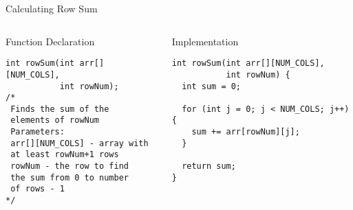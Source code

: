 \documentclass{beamer}
\begin{document}
\begin{frame}{Calculating Row Sum}
    \begin{columns}
        \begin{column}{0.48\textwidth}
            \begin{block}{Function Declaration}
                \begin{lstlisting}[basicstyle=\ttfamily\footnotesize]
int rowSum(int arr[][NUM_COLS], 
           int rowNum);
/*
 Finds the sum of the 
 elements of rowNum
 Parameters:
 arr[][NUM_COLS] - array with 
 at least rowNum+1 rows
 rowNum - the row to find 
 the sum from 0 to number 
 of rows - 1
*/
                \end{lstlisting}
            \end{block}
        \end{column}
        \begin{column}{0.48\textwidth}
            \begin{block}{Implementation}
                \begin{lstlisting}[basicstyle=\ttfamily\footnotesize]
int rowSum(int arr[][NUM_COLS], 
           int rowNum) {
  int sum = 0;
  
  for (int j = 0; j < NUM_COLS; j++) {
    sum += arr[rowNum][j];
  }
  
  return sum;
}
                \end{lstlisting}
            \end{block}
        \end{column}
    \end{columns}
\end{frame}
\end{document}

